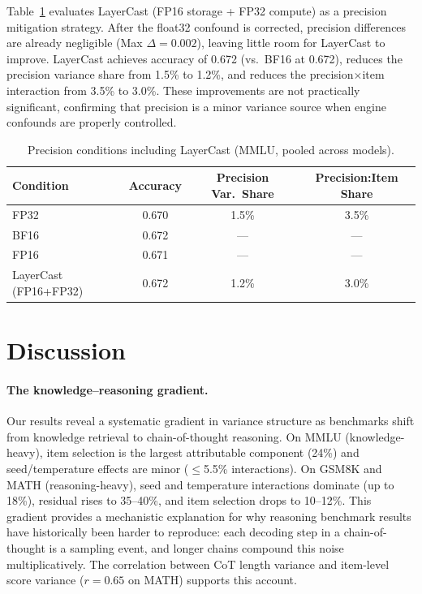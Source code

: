 \documentclass[letterpaper]{article}
\begin{document}
Table~\ref{tab:layercast} evaluates LayerCast (FP16 storage + FP32 compute) as a precision mitigation strategy.
After the float32 confound is corrected, precision differences are already negligible (Max $\Delta = 0.002$), leaving little room for LayerCast to improve.
LayerCast achieves accuracy of 0.672 (vs.\ BF16 at 0.672), reduces the precision variance share from 1.5\% to 1.2\%, and reduces the precision$\times$item interaction from 3.5\% to 3.0\%.
These improvements are not practically significant, confirming that precision is a minor variance source when engine confounds are properly controlled.

\begin{table}[t]
\centering
\caption{Precision conditions including LayerCast (MMLU, pooled across models).}
\label{tab:layercast}
\small
\begin{tabular}{lccc}
\toprule
Condition & Accuracy & Precision Var.\ Share & Precision:Item Share \\
\midrule
FP32                    & 0.670 & 1.5\% & 3.5\% \\
BF16                    & 0.672 & ---   & ---   \\
FP16                    & 0.671 & ---   & ---   \\
LayerCast (FP16+FP32)   & 0.672 & 1.2\% & 3.0\% \\
\bottomrule
\end{tabular}
\end{table}


\section{Discussion}

\paragraph{The knowledge--reasoning gradient.}
Our results reveal a systematic gradient in variance structure as benchmarks shift from knowledge retrieval to chain-of-thought reasoning.
On MMLU (knowledge-heavy), item selection is the largest attributable component (24\%) and seed/temperature effects are minor ($\leq$5.5\% interactions).
On GSM8K and MATH (reasoning-heavy), seed and temperature interactions dominate (up to 18\%), residual rises to 35--40\%, and item selection drops to 10--12\%.
This gradient provides a mechanistic explanation for why reasoning benchmark results have historically been harder to reproduce: each decoding step in a chain-of-thought is a sampling event, and longer chains compound this noise multiplicatively.
The correlation between CoT length variance and item-level score variance ($r=0.65$ on MATH) supports this account.
\end{document}
